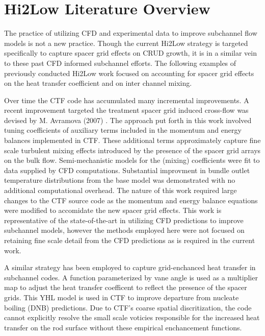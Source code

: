\section{Hi2Low Literature Overview}

The practice of utilizing CFD and experimental data to improve subchannel flow models is not a new practice.  Though the current Hi2Low strategy is targeted specifically to capture spacer grid effects on CRUD growth, it is in a similar vein to these past CFD informed subchannel efforts.  The following examples of previously conducted Hi2Low work focused on accounting for spacer grid effects on the heat transfer coefficient and on inter channel mixing. 

Over time the CTF code has accumulated many incremental improvements.  A recent improvement targeted the treatment spacer grid induced cross-flow was devised by M. Avramova (2007) \cite{avramova2007}. 
The approach put forth in this work involved tuning coefficients of auxiliary terms included in the momentum and energy balances implemented in CTF.  These additional terms approximately capture fine scale turbulent mixing effects introduced by the presence of the spacer grid arrays on the bulk flow.  Semi-mechanistic models for the (mixing) coefficients were fit to data supplied by CFD computations.  Substantial improvment in bundle outlet temperature distributions from the base model was demonstrated with no additional computational overhead.  The nature of this work required large changes to the CTF source code as the momentum and energy balance equations were modified to accomidate the new spacer grid effects.   This work is representative of the state-of-the-art in utilizing CFD predictions to improve subchannel models, however the methods employed here were not focused on retaining fine scale detail from the CFD predictions as is required in the current work.

A similar strategy has been employed to capture grid-enchanced heat transfer in subchannel codes.   A function parameterized by vane angle is used as a multiplier map to adjust the heat transfer coefficent to reflect the presence of the spacer grids.  This YHL model is used in CTF to improve departure from nucleate boiling (DNB) predictions.  Due to CTF's coarse spatial discritization, the code cannot explicitly resolve the small scale voticies responsible for the increased heat transfer on the rod surface without these empirical enchancement functions.   

